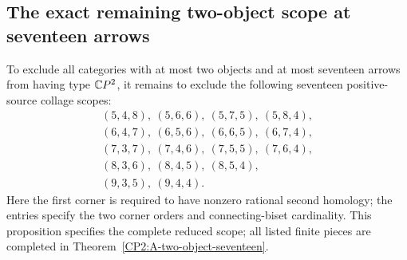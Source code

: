 \subsection{The exact remaining two-object scope at seventeen arrows}

\begin{proposition}
\label{CP2:A-two-object-seventeen-scope}
To exclude all categories with at most two objects and at
most seventeen arrows from having type $\mathbb{C}P^2$, it remains
to exclude the following seventeen positive-source collage
scopes:
\[
\begin{gathered}
(5,4,8),\ (5,6,6),\ (5,7,5),\ (5,8,4),\\
(6,4,7),\ (6,5,6),\ (6,6,5),\ (6,7,4),\\
(7,3,7),\ (7,4,6),\ (7,5,5),\ (7,6,4),\\
(8,3,6),\ (8,4,5),\ (8,5,4),\\
(9,3,5),\ (9,4,4).
\end{gathered}
\]
Here the first corner is required to have nonzero rational
second homology; the entries specify the two corner orders
and connecting-biset cardinality. This proposition specifies the complete reduced scope; all
listed finite pieces are completed in
Theorem~\ref{CP2:A-two-object-seventeen}.
\end{proposition}
